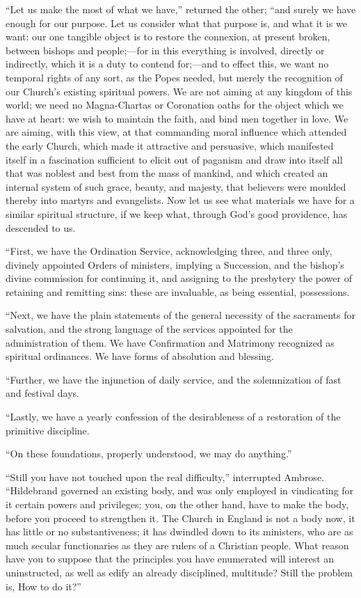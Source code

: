 ``Let us make the most of what we have,''
returned the other; ``and surely we have enough for our purpose. Let us
consider what that purpose is, and what it is we want: our one
tangible object is to restore the connexion, at present broken,
between bishops and people;—for in this everything is involved,
directly or indirectly, which it is a duty to contend for;—and to
effect this, we want no temporal rights of any sort, as the Popes
needed, but merely the recognition of our Church's existing spiritual
powers. We are not aiming at any kingdom of this world; we need no
Magna-Chartas or Coronation oaths for the object which we have at
heart: we wish to maintain the faith, and bind men together in love.
We are aiming, with this view, at that commanding moral influence
which attended the early Church, which made it attractive and
persuasive, which manifested itself in a fascination sufficient to
elicit out of paganism and draw into itself all that was noblest and
best from the mass of mankind, and which created an internal system of
such grace, beauty, and majesty, that believers were moulded thereby
into martyrs and evangelists. Now let us see what materials we have
for a similar spiritual structure, if we keep what, through God's good
providence, has descended to us.

``First, we have the Ordination Service,
acknowledging three, and three only, divinely appointed Orders of
ministers, implying a Succession, and the bishop's divine commission
for continuing it, and assigning to the presbytery the power of
retaining and remitting sins: these are invaluable, as being
essential, possessions.

``Next, we have the plain statements of the
general necessity of the sacraments for salvation, and the strong
language of the services appointed for the administration of them. We
have Confirmation and Matrimony recognized as spiritual
ordinances. We have forms of absolution and blessing.

``Further, we have the injunction of daily
service, and the solemnization of fast and festival days.

``Lastly, we have a yearly confession of the
desirableness of a restoration of the primitive discipline.

``On these foundations, properly understood, we
may do anything.''

``Still you have not touched upon the real
difficulty,'' interrupted Ambrose. ``Hildebrand governed an existing
body, and was only employed in vindicating for it certain powers and
privileges; you, on the other hand, have to make the body, before you
proceed to strengthen it. The Church in England is not a body now, it
has little or no substantiveness; it has dwindled down to its
ministers, who are as much secular functionaries as they are rulers of
a Christian people. What reason have you to suppose that the
principles you have enumerated will interest an uninstructed, as well
as edify an already disciplined, multitude? Still the problem is, How
to do it?''

